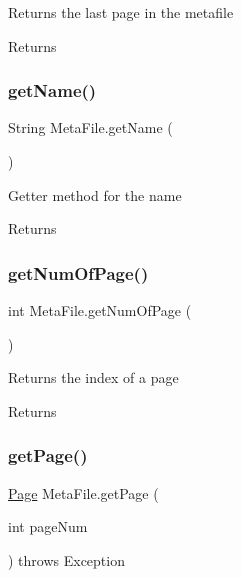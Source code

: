 Returns the last page in the metafile \begin{DoxyReturn}{Returns}

\end{DoxyReturn}
\mbox{\label{class_meta_file_a7704cca7da5d2e765d70d01562d6f4da}} 
\subsubsection{\texorpdfstring{get\+Name()}{getName()}}
{\footnotesize\ttfamily String Meta\+File.\+get\+Name (\begin{DoxyParamCaption}{ }\end{DoxyParamCaption})\hspace{0.3cm}{\ttfamily [inline]}}

Getter method for the name \begin{DoxyReturn}{Returns}

\end{DoxyReturn}
\mbox{\label{class_meta_file_a05c2f305a2e388e3482962321ff7ba7e}} 
\subsubsection{\texorpdfstring{get\+Num\+Of\+Page()}{getNumOfPage()}}
{\footnotesize\ttfamily int Meta\+File.\+get\+Num\+Of\+Page (\begin{DoxyParamCaption}{ }\end{DoxyParamCaption})\hspace{0.3cm}{\ttfamily [inline]}}

Returns the index of a page \begin{DoxyReturn}{Returns}

\end{DoxyReturn}
\mbox{\label{class_meta_file_a28c7cbf3f8889b484df5b11b99825a4e}} 
\subsubsection{\texorpdfstring{get\+Page()}{getPage()}}
{\footnotesize\ttfamily \mbox{\hyperlink{class_page}{Page}} Meta\+File.\+get\+Page (\begin{DoxyParamCaption}\item[{int}]{page\+Num }\end{DoxyParamCaption}) throws Exception\hspace{0.3cm}{\ttfamily [inline]}}

